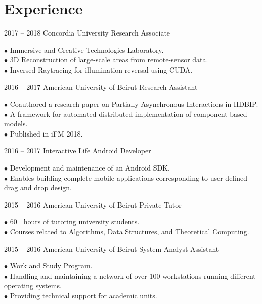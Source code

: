 \documentclass{tccv}
\begin{document}
\section{Experience}
\begin{eventlist}

\item{2017 -- 2018}
     {Concordia University}
     {Research Associate}

$\bullet$ Immersive and Creative Technologies Laboratory.\\
$\bullet$ 3D Reconstruction of large-scale areas from remote-sensor data.\\
$\bullet$ Inversed Raytracing for illumination-reversal using CUDA.



\item{2016 -- 2017}
     {American University of Beirut}
     {Research Assistant}

$\bullet$ Coauthored a research paper on Partially Asynchronous Interactions in HDBIP.\\
$\bullet$ A framework for automated distributed implementation of component-based models. \\
    $\bullet$ Published in iFM 2018. 

\item{2016 -- 2017}
     {Interactive Life}
     {Android Developer}

$\bullet$ Development and maintenance of an Android SDK.\\
$\bullet$ Enables building complete mobile applications corresponding to user-defined drag and drop design.

\item{2015 -- 2016}
     {American University of Beirut}
     {Private Tutor}

$\bullet$ $60^+$ hours of tutoring university students.\\
$\bullet$ Courses related to Algorithms, Data Structures, and Theoretical Computing.

\item{2015 -- 2016}
     {American University of Beirut}
     {System Analyst Assistant}

$\bullet$ Work and Study Program.\\
$\bullet$ Handling and maintaining a network of over 100 workstations running different operating systems. \\
$\bullet$ Providing technical support for academic units.


\end{eventlist}
\end{document}
